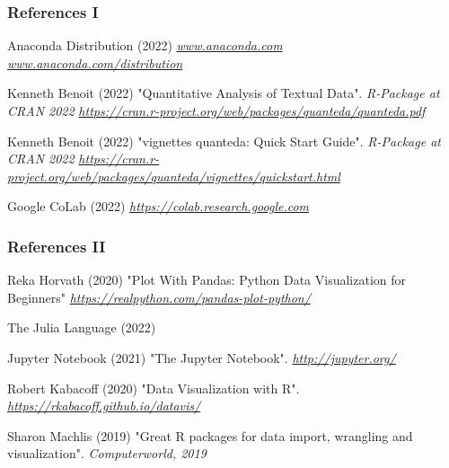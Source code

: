 \documentclass{beamer}
\begin{document}
\begin{frame}
\frametitle{References I}
\footnotesize{
\begin{thebibliography}{99} %

 Anaconda Distribution (2022)
\newblock \emph{\href{https://www.anaconda.com}{www.anaconda.com}}
\newblock \emph{\href{https://www.anaconda.com/distribution/}{www.anaconda.com/distribution}}

 Kenneth Benoit (2022)
\newblock "Quantitative Analysis of Textual Data".
\newblock \emph{R-Package at CRAN 2022}
\newblock \emph{\url{https://cran.r-project.org/web/packages/quanteda/quanteda.pdf}}

 Kenneth Benoit (2022)
\newblock "vignettes quanteda: Quick Start Guide".
\emph{R-Package at CRAN 2022}
\newblock \emph{\url{https://cran.r-project.org/web/packages/quanteda/vignettes/quickstart.html}}

 Google CoLab (2022)
\newblock \emph{\url{https://colab.research.google.com}}

\end{thebibliography}
}
\end{frame}


\begin{frame}
\frametitle{References II}
\footnotesize{
\begin{thebibliography}{99} 



 Reka Horvath (2020)
\newblock "Plot With Pandas: Python Data Visualization for Beginners"
\newblock \emph{\url{https://realpython.com/pandas-plot-python/}}

 The Julia Language (2022)

 Jupyter Notebook (2021)
\newblock "The Jupyter Notebook".
\emph{\url{http://jupyter.org/}}

 Robert Kabacoff (2020)
\newblock  "Data Visualization with R".
\emph{\url{https://rkabacoff.github.io/datavis/}}

 Sharon Machlis (2019)
\newblock "Great R packages for data import, wrangling and visualization".
\newblock \emph{Computerworld, 2019}

\end{thebibliography}
}
\end{frame}
\end{document}
